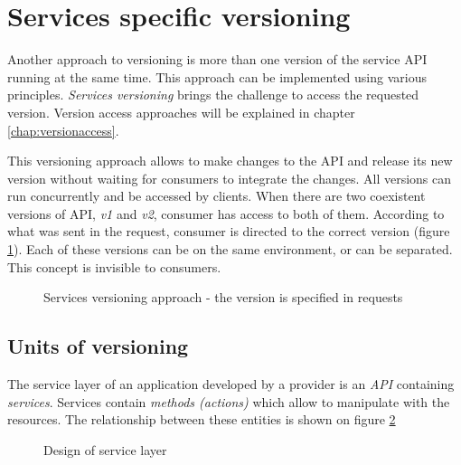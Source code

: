 \section{Services specific versioning}
Another approach to versioning is more than one version of the service API running at the same time. This approach can be implemented using various principles. \emph{Services versioning} brings the challenge to access the requested version. Version access approaches will be explained in chapter \ref{chap:versionaccess}.


This versioning approach allows to make changes to the API and release its new version without waiting for consumers to integrate the changes. All versions can run concurrently and be accessed by clients. When there are two coexistent versions of API, \emph{v1} and \emph{v2}, consumer has access to both of them. According to what was sent in the request, consumer is directed to the correct version (figure \ref{fig:services-specific-versioning}). Each of these versions can be on the same environment, or can be separated. This concept is invisible to consumers.


\begin{figure}[htp] 
\caption{Services versioning approach - the version is specified in requests}
\label{fig:services-specific-versioning}
\end{figure} 


\subsection{Units of versioning}
\label{sec:units}
The service layer of an application developed by a provider is an \emph{API} containing \emph{services}. Services contain \emph{methods (actions)} which allow to manipulate with the resources. The relationship between these entities is shown on figure \ref{fig:service-layer-design}

\begin{figure}[htp] 
\caption{Design of service layer}
\label{fig:service-layer-design}
\end{figure} 

